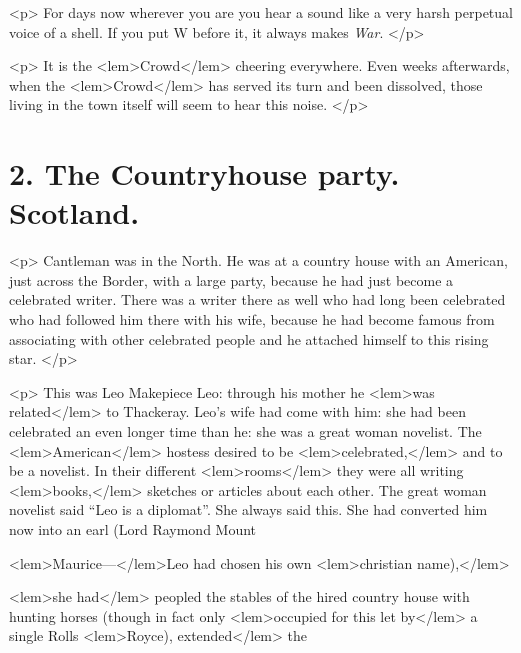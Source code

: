 				<p>
					For days now wherever you are you hear a sound like a very harsh perpetual voice of 
					a shell. If you put W before it, it always makes \emph{War}. 
 				</p>

				<p>
					It is the 
<lem>Crowd</lem>{} cheering everywhere. Even weeks afterwards, when the 
<lem>Crowd</lem>
						{}
					has 
					served its turn and been dissolved, those living in the town itself will seem to hear 
					this noise. 
 				</p>

\newpage %

	\section*{2. The Countryhouse party. Scotland.}

				<p>
					Cantleman was in the North. He was at a country house with an American, just across 
					the Border, with a large party, because he had just become a celebrated writer. 
					There was a writer there as well who had long been celebrated who had followed him 
					there with his wife, because he had become famous from associating with other 
					celebrated people and he attached himself to this rising star. 
 				</p>

				<p>
					This was Leo Makepiece Leo: through his mother he 
<lem>was related</lem>
						{}
					to Thackeray. Leo's wife 
					had come with him: she had been celebrated an even longer time than he: she was 
					a great woman novelist.  The 
<lem>American</lem>{} hostess desired to be 
<lem>celebrated,</lem>
						{} 
					and to be a 
					novelist. In their different 
<lem>rooms</lem>
						{} 
					they were all writing 
<lem>books,</lem>
						{} 
					sketches or 
					articles about each other. The great woman novelist said “Leo is a diplomat”. She 
					always said this. She had converted him now into an earl (Lord Raymond Mount 
					
<lem>Maurice---</lem>{}Leo had chosen his own 
<lem>christian name),</lem>
						{}
					
<lem>she had</lem>
						{} 
					peopled the stables of the 
					hired country house with hunting horses (though in fact only 
<lem>occupied for this let by</lem>
						{} 
					a single 
					Rolls 
<lem>Royce), extended</lem>
						{}
					the 
					
